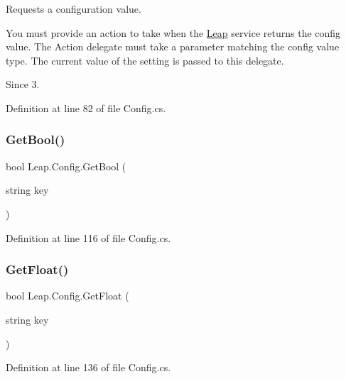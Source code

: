 Requests a configuration value. 

You must provide an action to take when the \mbox{\hyperlink{namespace_leap}{Leap}} service returns the config value. The Action delegate must take a parameter matching the config value type. The current value of the setting is passed to this delegate.

\begin{DoxySince}{Since}
3. 
\end{DoxySince}


Definition at line 82 of file Config.\+cs.

\mbox{\label{class_leap_1_1_config_abad3addef437788d854f8fd5fcd5f6be}} 
\subsubsection{\texorpdfstring{GetBool()}{GetBool()}}
{\footnotesize\ttfamily bool Leap.\+Config.\+Get\+Bool (\begin{DoxyParamCaption}\item[{string}]{key }\end{DoxyParamCaption})}



Definition at line 116 of file Config.\+cs.

\mbox{\label{class_leap_1_1_config_aead7d2a5648223fe040b3b53e51ac5b6}} 
\subsubsection{\texorpdfstring{GetFloat()}{GetFloat()}}
{\footnotesize\ttfamily bool Leap.\+Config.\+Get\+Float (\begin{DoxyParamCaption}\item[{string}]{key }\end{DoxyParamCaption})}



Definition at line 136 of file Config.\+cs.

\mbox{\label{class_leap_1_1_config_abd25aba72fa00937fbec3d499f52a70a}} 
